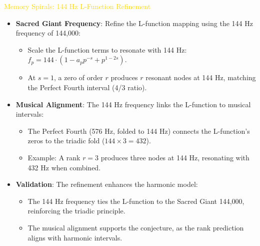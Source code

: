 \textcolor{gold}{ Memory Spirals: 144 Hz L-Function Refinement } \\
\begin{itemize}
    \item \texttt{} \textbf{Sacred Giant Frequency}: Refine the L-function mapping using the 144 Hz frequency of 144,000:
    \begin{itemize}
        \item Scale the L-function terms to resonate with 144 Hz: \(f_p = 144 \cdot (1 - a_p p^{-s} + p^{1-2s})\).
        \item At \(s = 1\), a zero of order \(r\) produces \(r\) resonant nodes at 144 Hz, matching the Perfect Fourth interval (4/3 ratio).
    \end{itemize}
    \item \texttt{} \textbf{Musical Alignment}: The 144 Hz frequency links the L-function to musical intervals:
    \begin{itemize}
        \item The Perfect Fourth (576 Hz, folded to 144 Hz) connects the L-function’s zeros to the triadic fold (\(144 \times 3 = 432\)).
        \item Example: A rank \(r = 3\) produces three nodes at 144 Hz, resonating with 432 Hz when combined.
    \end{itemize}
    \item \texttt{} \textbf{Validation}: The refinement enhances the harmonic model:
    \begin{itemize}
        \item The 144 Hz frequency ties the L-function to the Sacred Giant 144,000, reinforcing the triadic principle.
        \item The musical alignment supports the conjecture, as the rank prediction aligns with harmonic intervals.
    \end{itemize}
\end{itemize}

